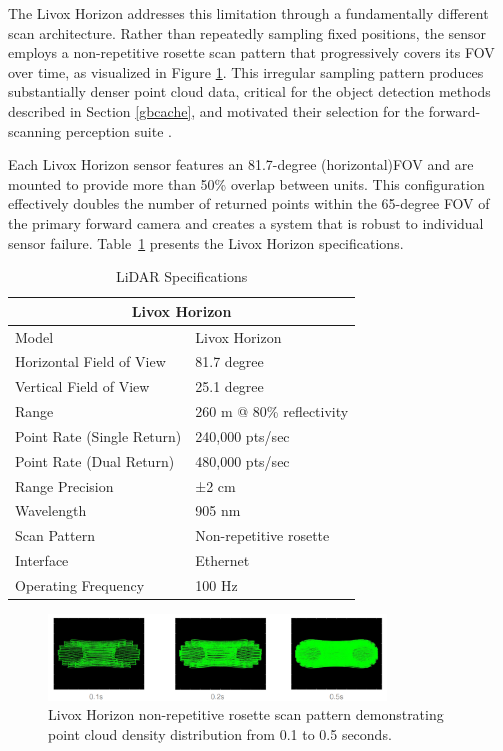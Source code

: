 \documentclass{erauthesis}
\begin{document}
The Livox Horizon addresses this limitation through a fundamentally different scan architecture.
Rather than repeatedly sampling fixed positions, the sensor employs a non-repetitive rosette scan pattern that progressively covers its \ac{FOV} over time, as visualized in Figure \ref{fig:livox_scan_pattern}.
This irregular sampling pattern produces substantially denser point cloud data, critical for the object detection methods described in Section \ref{gbcache}, and motivated their selection for the forward-scanning perception suite \cite{thompson2023}.


Each Livox Horizon sensor features an 81.7-degree (horizontal)\ac{FOV} and are mounted to provide more than 50\% overlap between units.
This configuration effectively doubles the number of returned points within the 65-degree \ac{FOV} of the primary forward camera and creates a system that is robust to individual sensor failure.
Table~\ref{tab:livox_horizon_specs} presents the Livox Horizon specifications.

\begin{table}[htpb]
\centering
\caption{LiDAR Specifications}
\begin{tabular}{ll}
\hline
\multicolumn{2}{c}{Livox Horizon}\\
\hline
\hline
Model & Livox Horizon \\
Horizontal Field of View & 81.7 degree \\
Vertical Field of View & 25.1 degree \\
Range & 260 m @ 80\% reflectivity \\
Point Rate (Single Return) & 240,000 pts/sec \\
Point Rate (Dual Return) & 480,000 pts/sec \\
Range Precision & ±2 cm \\
Wavelength & 905 nm \\
Scan Pattern & Non-repetitive rosette \\
Interface & Ethernet \\
Operating Frequency & 100 Hz \\
\hline
\end{tabular}
\label{tab:livox_horizon_specs}
\end{table}

\begin{figure}[htbp]
\centering
\includegraphics[width=0.8\textwidth]{Images/Livox_1.png}
\caption{Livox Horizon non-repetitive rosette scan pattern demonstrating point cloud density distribution from 0.1 to 0.5 seconds.}
\label{fig:livox_scan_pattern}
\end{figure}
\end{document}
